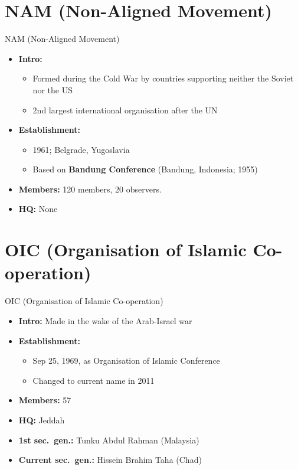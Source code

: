 \documentclass[
  12pt,
  ignorenonframetext,
  progressbar=frametitle]{beamer}
\providecommand{\tightlist}{%
  \setlength{\itemsep}{0pt}\setlength{\parskip}{0pt}}
\begin{document}
\section{NAM (Non-Aligned Movement)}
\begin{frame}[allowframebreaks]
{NAM (Non-Aligned Movement)}
\protect\hypertarget{nam-non-aligned-movement}{}
\begin{itemize}
\tightlist
\item
  \textbf{Intro:}

  \begin{itemize}
  \tightlist
  \item
    Formed during the Cold War by countries supporting neither the
    Soviet nor the US
  \item
    2nd largest international organisation after the UN
  \end{itemize}
\item
  \textbf{Establishment:}

  \begin{itemize}
  \tightlist
  \item
    1961; Belgrade, Yugoslavia
  \item
    Based on \textbf{Bandung Conference} (Bandung, Indonesia; 1955)
  \end{itemize}
\item
  \textbf{Members:} 120 members, 20 observers.
\item
  \textbf{HQ:} None
\end{itemize}
\end{frame}

\section{OIC (Organisation of Islamic Co-operation)}
\begin{frame}[allowframebreaks]
{OIC (Organisation of Islamic Co-operation)}
\protect\hypertarget{oic-organisation-of-islamic-co-operation}{}
\begin{itemize}
\tightlist
\item
  \textbf{Intro:} Made in the wake of the Arab-Israel war
\item
  \textbf{Establishment:}

  \begin{itemize}
  \tightlist
  \item
    Sep 25, 1969, as Organisation of Islamic Conference
  \item
    Changed to current name in 2011
  \end{itemize}
\item
  \textbf{Members:} 57
\item
  \textbf{HQ:} Jeddah
\item
  \textbf{1st sec.~gen.:} Tunku Abdul Rahman (Malaysia)
\item
  \textbf{Current sec.~gen.:} Hissein Brahim Taha (Chad)
\end{itemize}
\end{frame}
\end{document}
